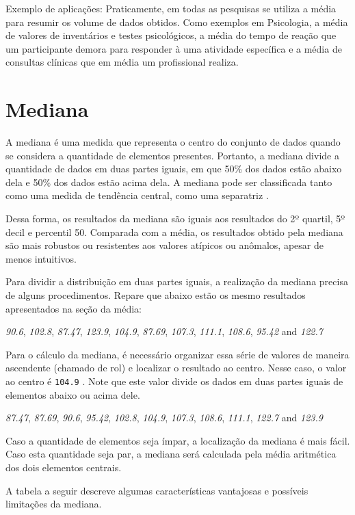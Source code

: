 \documentclass[
]{book}
\begin{document}
Exemplo de aplicações: Praticamente, em todas as pesquisas se utiliza a média para resumir os volume de dados obtidos. Como exemplos em Psicologia, a média de valores de inventários e testes psicológicos, a média do tempo de reação que um participante demora para responder à uma atividade específica e a média de consultas clínicas que em média um profissional realiza.

\hypertarget{mediana}{%
\section{Mediana}\label{mediana}}

A mediana é uma medida que representa o centro do conjunto de dados quando se considera a quantidade de elementos presentes. Portanto, a mediana divide a quantidade de dados em duas partes iguais, em que 50\% dos dados estão abaixo dela e 50\% dos dados estão acima dela. A mediana pode ser classificada tanto como uma medida de tendência central, como uma separatriz \citep{neto2010}.

Dessa forma, os resultados da mediana são iguais aos resultados do 2º quartil, 5º decil e percentil 50. Comparada com a média, os resultados obtido pela mediana são mais robustos ou resistentes aos valores atípicos ou anômalos, apesar de menos intuitivos.

Para dividir a distribuição em duas partes iguais, a realização da mediana precisa de alguns procedimentos. Repare que abaixo estão os mesmo resultados apresentados na seção da média:

\emph{90.6}, \emph{102.8}, \emph{87.47}, \emph{123.9}, \emph{104.9}, \emph{87.69}, \emph{107.3}, \emph{111.1}, \emph{108.6}, \emph{95.42} and \emph{122.7}

Para o cálculo da mediana, é necessário organizar essa série de valores de maneira ascendente (chamado de rol) e localizar o resultado ao centro. Nesse caso, o valor ao centro é \texttt{104.9} . Note que este valor divide os dados em duas partes iguais de elementos abaixo ou acima dele.

\emph{87.47}, \emph{87.69}, \emph{90.6}, \emph{95.42}, \emph{102.8}, \emph{104.9}, \emph{107.3}, \emph{108.6}, \emph{111.1}, \emph{122.7} and \emph{123.9}

Caso a quantidade de elementos seja ímpar, a localização da mediana é mais fácil. Caso esta quantidade seja par, a mediana será calculada pela média aritmética dos dois elementos centrais.

A tabela a seguir descreve algumas características vantajosas e possíveis limitações da mediana.
\end{document}
